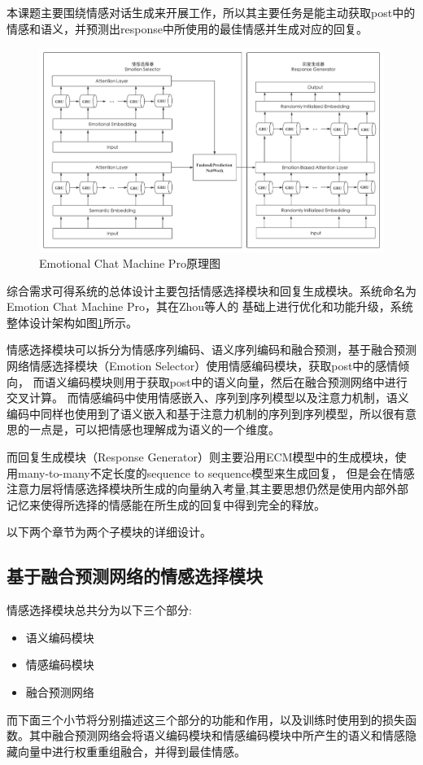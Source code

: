 \documentclass[supercite]{HustGraduPaper}
\theoremstyle{definition}
\begin{document}
本课题主要围绕情感对话生成来开展工作，所以其主要任务是能主动获取post中的情感和语义，并预测出response中所使用的最佳情感并生成对应的回复。
\begin{figure}[H] %
  \centering %
  \includegraphics[width=1\textwidth]{images/ECMP.png} %
  \caption{Emotional Chat Machine Pro原理图} %
  \label{Fig.ECMP} %
\end{figure}
综合需求可得系统的总体设计主要包括情感选择模块和回复生成模块。系统命名为Emotion Chat Machine Pro，其在Zhou等人\cite{DBLP:journals/corr/ZhouHZZL17}的
基础上进行优化和功能升级，系统整体设计架构如图\ref{Fig.ECMP}所示。

情感选择模块可以拆分为情感序列编码、语义序列编码和融合预测，基于融合预测网络情感选择模块\cite{wei2019emotion}（Emotion Selector）使用情感编码模块，获取post中的感情倾向，
而语义编码模块则用于获取post中的语义向量，然后在融合预测网络中进行交叉计算。
而情感编码中使用情感嵌入、序列到序列模型以及注意力机制，语义编码中同样也使用到了语义嵌入和基于注意力机制的序列到序列模型，所以很有意思的一点是，可以把情感也理解成为语义的一个维度。

而回复生成模块（Response Generator）则主要沿用ECM\cite{DBLP:journals/corr/ZhouHZZL17}模型中的生成模块，使用many-to-many不定长度的sequence to sequence模型来生成回复，
但是会在情感注意力层将情感选择模块所生成的向量纳入考量,其主要思想仍然是使用内部外部记忆来使得所选择的情感能在所生成的回复中得到完全的释放。

以下两个章节为两个子模块的详细设计。

\subsection{基于融合预测网络的情感选择模块}
情感选择模块总共分为以下三个部分:
\begin{itemize}
  \item 语义编码模块
  \item 情感编码模块
  \item 融合预测网络
\end{itemize} 
而下面三个小节将分别描述这三个部分的功能和作用，以及训练时使用到的损失函数。其中融合预测网络会将语义编码模块和情感编码模块中所产生的语义和情感隐藏向量中进行权重重组融合，并得到最佳情感。
\end{document}
